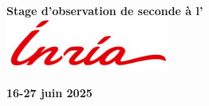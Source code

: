 \documentclass{article}
\begin{document}
\vspace*{\fill}
\begin{center}
    \Huge\textbf{Stage d'observation de seconde à  l'} \\[1cm]
    \includegraphics[width=0.4\textwidth]{inria.jpg} %
\end{center}
\vspace*{\fill}

\begin{center}
    \Large\textbf{16-27 juin 2025}
\end{center}
\vspace{1cm}
\end{document}
